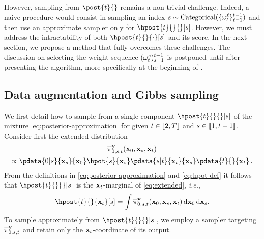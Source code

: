 However, sampling from $\post{t}{}$ remains a non-trivial challenge. Indeed, a naive procedure would consist in sampling an index $s \sim \mbox{Categorical}(\{ \omega^\ell _t \}_{\ell = 1}^{t-1})$ and then use an approximate sampler only for $\hpost{t}{}{}[s]$. However, we must address the intractability of both $\hpost{t}{}{\cdot}[s]$ and its score. In the next section, we propose a method that fully overcomes these challenges. The discussion on selecting the weight sequence $(\omega^s_t)_{s=1}^{t-1}$ is postponed until after presenting the algorithm, more specifically at the beginning of .

\subsection{Data augmentation and Gibbs sampling}

We first detail how to sample from a single component $\hpost{t}{}{}[s]$ of the mixture \eqref{eq:posterior-approximation} for given $t \in \llbracket 2, T \rrbracket$ and $s \in \llbracket 1, t-1 \rrbracket$. 
Consider first the extended distribution
\begin{multline}
    \label{eq:extended}
    \epost{0, s, t}{}{\bx_0, \bx_s, \bx_t} \\ \propto \pdata{0|s}{\bx_s}{\bx_0} \hpot{s}{\bx_s} \pdata{s|t}{\bx_t}{\bx_s} \pdata{t}{}{\bx_t} \eqsp.
\end{multline}
From the definitions in \eqref{eq:posterior-approximation} and \eqref{eq:hpot-def} it follows that $\hpost{t}{}{}[s]$ is the $\mathbf{x}_t$-marginal of \eqref{eq:extended}, \emph{i.e.}, 
\[
\hpost{t}{}{\bx_t}[s] = \int \epost{0, s, t}{}{\bx_0, \bx_s, \bx_t} \, \rmd \bx_0 \, \rmd \bx_s.
\]
To sample approximately from $\hpost{t}{}{}[s]$, we employ a sampler targeting $\epost{0, s, t}{}{}$ and retain only the $\mathbf{x}_t$-coordinate of its output. 


